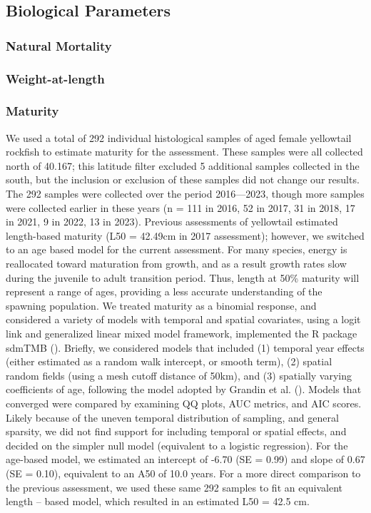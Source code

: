 \documentclass[
]{scrartcl}
\begin{document}
\subsection{Biological Parameters}\label{biological-parameters}

\subsubsection{Natural Mortality}\label{natural-mortality}

\subsubsection{Weight-at-length}\label{weight-at-length}

\subsubsection{Maturity}\label{maturity}

We used a total of 292 individual histological samples of aged female
yellowtail rockfish to estimate maturity for the assessment. These
samples were all collected north of 40.167; this latitude filter
excluded 5 additional samples collected in the south, but the inclusion
or exclusion of these samples did not change our results. The 292
samples were collected over the period 2016---2023, though more samples
were collected earlier in these years (n = 111 in 2016, 52 in 2017, 31
in 2018, 17 in 2021, 9 in 2022, 13 in 2023). Previous assessments of
yellowtail estimated length-based maturity (L50 = 42.49cm in 2017
assessment); however, we switched to an age based model for the current
assessment. For many species, energy is reallocated toward maturation
from growth, and as a result growth rates slow during the juvenile to
adult transition period. Thus, length at 50\% maturity will represent a
range of ages, providing a less accurate understanding of the spawning
population. We treated maturity as a binomial response, and considered a
variety of models with temporal and spatial covariates, using a logit
link and generalized linear mixed model framework, implemented the R
package sdmTMB ().
Briefly, we considered models that included (1) temporal year effects
(either estimated as a random walk intercept, or smooth term), (2)
spatial random fields (using a mesh cutoff distance of 50km), and (3)
spatially varying coefficients of age, following the model adopted by
Grandin et al. (). Models that
converged were compared by examining QQ plots, AUC metrics, and AIC
scores. Likely because of the uneven temporal distribution of sampling,
and general sparsity, we did not find support for including temporal or
spatial effects, and decided on the simpler null model (equivalent to a
logistic regression). For the age-based model, we estimated an intercept
of -6.70 (SE = 0.99) and slope of 0.67 (SE = 0.10), equivalent to an A50
of 10.0 years. For a more direct comparison to the previous assessment,
we used these same 292 samples to fit an equivalent length -- based
model, which resulted in an estimated L50 = 42.5 cm.
\end{document}
